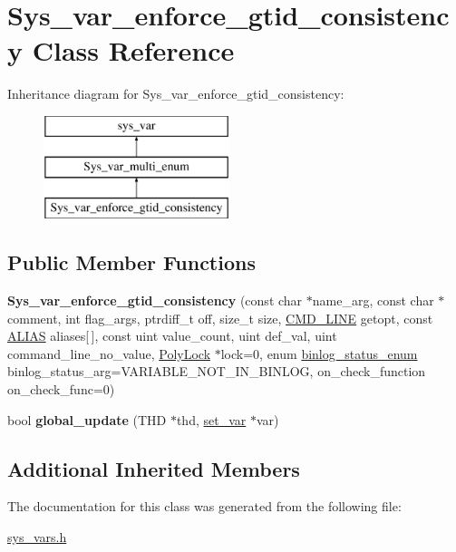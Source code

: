 \hypertarget{classSys__var__enforce__gtid__consistency}{}\section{Sys\+\_\+var\+\_\+enforce\+\_\+gtid\+\_\+consistency Class Reference}
\label{classSys__var__enforce__gtid__consistency}
Inheritance diagram for Sys\+\_\+var\+\_\+enforce\+\_\+gtid\+\_\+consistency\+:\begin{figure}[H]
\begin{center}
\leavevmode
\includegraphics[height=3.000000cm]{classSys__var__enforce__gtid__consistency}
\end{center}
\end{figure}
\subsection*{Public Member Functions}
\begin{DoxyCompactItemize}
\item 
\mbox{\label{classSys__var__enforce__gtid__consistency_ad21935d2f39e3216d6f4c914d8452e78}} 
{\bfseries Sys\+\_\+var\+\_\+enforce\+\_\+gtid\+\_\+consistency} (const char $\ast$name\+\_\+arg, const char $\ast$comment, int flag\+\_\+args, ptrdiff\+\_\+t off, size\+\_\+t size, \mbox{\hyperlink{structCMD__LINE}{C\+M\+D\+\_\+\+L\+I\+NE}} getopt, const \mbox{\hyperlink{structSys__var__multi__enum_1_1ALIAS}{A\+L\+I\+AS}} aliases\mbox{[}$\,$\mbox{]}, const uint value\+\_\+count, uint def\+\_\+val, uint command\+\_\+line\+\_\+no\+\_\+value, \mbox{\hyperlink{classPolyLock}{Poly\+Lock}} $\ast$lock=0, enum \mbox{\hyperlink{classsys__var_a664520ec82191888717c86085bfa83ce}{binlog\+\_\+status\+\_\+enum}} binlog\+\_\+status\+\_\+arg=V\+A\+R\+I\+A\+B\+L\+E\+\_\+\+N\+O\+T\+\_\+\+I\+N\+\_\+\+B\+I\+N\+L\+OG, on\+\_\+check\+\_\+function on\+\_\+check\+\_\+func=0)
\item 
\mbox{\label{classSys__var__enforce__gtid__consistency_ab4263e9a680419bee20490397644d594}} 
bool {\bfseries global\+\_\+update} (T\+HD $\ast$thd, \mbox{\hyperlink{classset__var}{set\+\_\+var}} $\ast$var)
\end{DoxyCompactItemize}
\subsection*{Additional Inherited Members}


The documentation for this class was generated from the following file\+:\begin{DoxyCompactItemize}
\item 
\mbox{\hyperlink{sys__vars_8h}{sys\+\_\+vars.\+h}}\end{DoxyCompactItemize}
